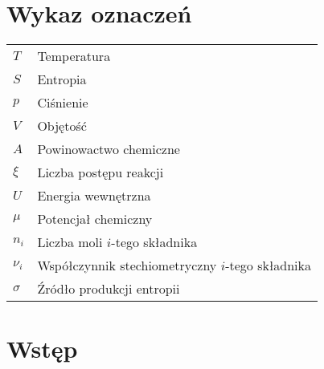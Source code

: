\documentclass[10pt, a4paper, twoside, onecolumn]{article}
\numberwithin{equation}{section}
\begin{document}
	\section*{Wykaz oznaczeń}
	\setlength{\parindent}{0cm}
	\begin{table}[H]
	\begin{tabular}{@{} ll}
		\(T\) & Temperatura \\
		\(S\) & Entropia \\
		\(p\) & Ciśnienie \\
		\(V\) & Objętość \\
		\(A\) & Powinowactwo chemiczne \\
		\(\xi\) & Liczba postępu reakcji \\
		\(U\) & Energia wewnętrzna \\
		\(\mu\) & Potencjał chemiczny \\
		\(n_{i}\) & Liczba moli $i$-tego składnika \\
		\(\nu_{i}\) & Współczynnik stechiometryczny $i$-tego składnika \\
		\(\sigma\) & Źródło produkcji entropii
	\end{tabular}
	\end{table}
	\setlength{\parindent}{1.25cm}
	\pagebreak
	
	\section{Wstęp}
	
\end{document}
